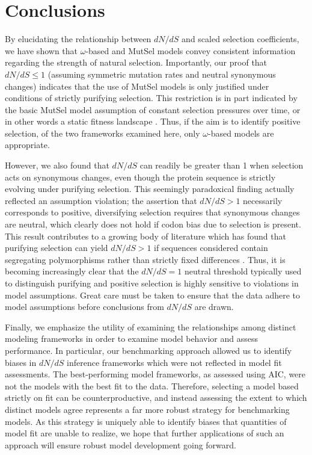 \documentclass[11pt]{article}
\begin{document}
\section*{Conclusions}
By elucidating the relationship between $dN/dS$ and scaled selection coefficients, we have shown that $\omega$-based and MutSel models convey consistent information regarding the strength of natural selection. Importantly, our proof that $dN/dS \leq 1$ (assuming symmetric mutation rates and neutral synonymous changes) indicates that the use of MutSel models is only justified under conditions of strictly purifying selection. This restriction is in part indicated by the basic MutSel model assumption of constant selection pressures over time, or in other words a static fitness landscape \cite{HalpernBruno1998,Thorneetal2007,Rodrigueetal2010,Thorne2012}. Thus, if the aim is to identify positive selection, of the two frameworks examined here, only $\omega$-based models are appropriate. 

However, we also found that $dN/dS$ can readily be greater than 1 when selection acts on synonymous changes, even though the protein sequence is strictly evolving under purifying selection. This seemingly paradoxical finding actually reflected an assumption violation; the assertion that $dN/dS > 1$ necessarily corresponds to positive, diversifying selection requires that synonymous changes are neutral, which clearly does not hold if codon bias due to selection is present. This result contributes to a growing body of literature which has found that purifying selection can yield $dN/dS > 1$ if sequences considered contain segregating polymorphisms rather than strictly fixed differences \cite{Rochaetal2006,KryazhimskiyPlotkin2008,Mugaletal2014}. Thus, it is becoming increasingly clear that the $dN/dS = 1$ neutral threshold typically used to distinguish purifying and positive selection is highly sensitive to violations in model assumptions. Great care must be taken to ensure that the data adhere to model assumptions before conclusions from $dN/dS$ are drawn.

Finally, we emphasize the utility of examining the relationships among distinct modeling frameworks in order to examine model behavior and assess performance. In particular, our benchmarking approach allowed us to identify biases in $dN/dS$ inference frameworks which were not reflected in model fit assessments. The best-performing model frameworks, as assessed using AIC, were not the models with the best fit to the data. Therefore, selecting a model based strictly on fit can be counterproductive, and instead assessing the extent to which distinct models agree represents a far more robust strategy for benchmarking models. As this strategy is uniquely able to identify biases that quantities of model fit are unable to realize, we hope that further applications of such an approach will ensure robust model development going forward.
\end{document}
